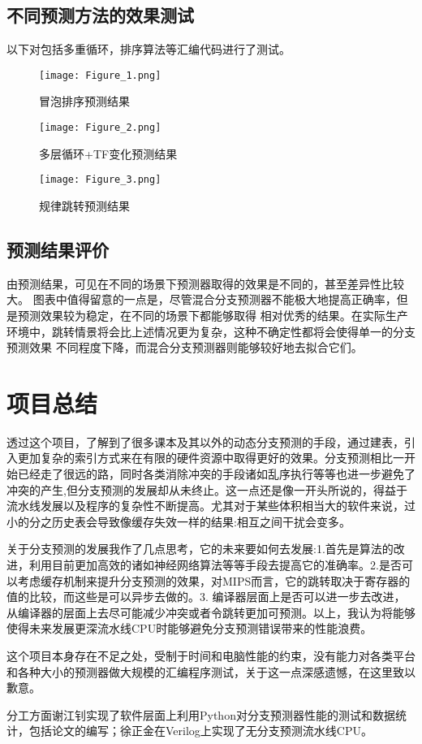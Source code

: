 \documentclass[forprint]{WHUBachelor}
\begin{document}
\section{不同预测方法的效果测试}
  以下对包括多重循环，排序算法等汇编代码进行了测试。\\
  \begin{figure}[ht]
    \centering
      \texttt{[image: Figure\_1.png]}
      \caption{冒泡排序预测结果}
      \label{fig:1}
    \end{figure}
  \begin{figure}[ht]
    \centering
      \texttt{[image: Figure\_2.png]}
      \caption{多层循环+TF变化预测结果}
      \label{fig:1}
    \end{figure}
  \begin{figure}[ht]
    \centering
      \texttt{[image: Figure\_3.png]}
      \caption{规律跳转预测结果}
      \label{fig:1}
    \end{figure}
  \section{预测结果评价}
  由预测结果，可见在不同的场景下预测器取得的效果是不同的，甚至差异性比较大。
  图表中值得留意的一点是，尽管混合分支预测器不能极大地提高正确率，但是预测效果较为稳定，在不同的场景下都能够取得
  相对优秀的结果。在实际生产环境中，跳转情景将会比上述情况更为复杂，这种不确定性都将会使得单一的分支预测效果
  不同程度下降，而混合分支预测器则能够较好地去拟合它们。

  
  \chapter{项目总结}
  透过这个项目，了解到了很多课本及其以外的动态分支预测的手段，通过建表，引入更加复杂的索引方式来在有限的硬件资源中取得更好的效果。分支预测相比一开始已经走了很远的路，同时各类消除冲突的手段诸如乱序执行等等也进一步避免了冲突的产生,但分支预测的发展却从未终止。这一点还是像一开头所说的，得益于流水线发展以及程序的复杂性不断提高。尤其对于某些体积相当大的软件来说，过小的分之历史表会导致像缓存失效一样的结果:相互之间干扰会变多。\par
关于分支预测的发展我作了几点思考，它的未来要如何去发展:1.首先是算法的改进，利用目前更加高效的诸如神经网络算法等等手段去提高它的准确率。2.是否可以考虑缓存机制来提升分支预测的效果，对MIPS而言，它的跳转取决于寄存器的值的比较，而这些是可以异步去做的。3. 编译器层面上是否可以进一步去改进，从编译器的层面上去尽可能减少冲突或者令跳转更加可预测。以上，我认为将能够使得未来发展更深流水线CPU时能够避免分支预测错误带来的性能浪费。\par
这个项目本身存在不足之处，受制于时间和电脑性能的约束，没有能力对各类平台和各种大小的预测器做大规模的汇编程序测试，关于这一点深感遗憾，在这里致以歉意。\par
分工方面谢江钊实现了软件层面上利用Python对分支预测器性能的测试和数据统计，包括论文的编写；徐正金在Verilog上实现了无分支预测流水线CPU。
  
\end{document}
